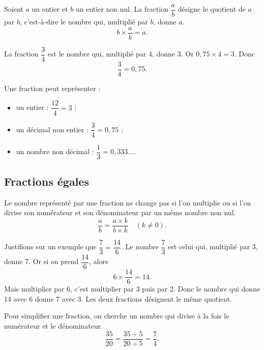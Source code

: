 \documentclass[11pt,a4paper]{article}
\begin{document}
\begin{definitionbox}
Soient \(a\) un entier et \(b\) un entier non nul. La fraction \(\dfrac{a}{b}\) désigne le quotient de \(a\) par \(b\), c'est-à-dire le nombre qui, multiplié par \(b\), donne \(a\).
\[
b\times\frac{a}{b}=a.
\]
\end{definitionbox}

\begin{exemplebox}
La fraction \(\dfrac{3}{4}\) est le nombre qui, multiplié par 4, donne 3. Or \(0,75\times4=3\). Donc
\[
\frac{3}{4}=0,75.
\]
\end{exemplebox}

\begin{retenirbox}
Une fraction peut représenter :
\begin{itemize}
\item un entier : \(\dfrac{12}{4}=3\) ;
\item un décimal non entier : \(\dfrac{3}{4}=0,75\) ;
\item un nombre non décimal : \(\dfrac{1}{3}=0,333\ldots\).
\end{itemize}
\end{retenirbox}

\subsection{Fractions égales}

\begin{theobox}
Le nombre représenté par une fraction ne change pas si l'on multiplie ou si l'on divise son numérateur et son dénominateur par un même nombre non nul.
\[
\frac{a}{b}=\frac{a\times k}{b\times k}\quad(k\neq0).
\]
\end{theobox}

\begin{preuvebox}
Justifions sur un exemple que \(\dfrac{7}{3}=\dfrac{14}{6}\). Le nombre \(\dfrac{7}{3}\) est celui qui, multiplié par 3, donne 7. Or si on prend \(\dfrac{14}{6}\), alors
\[
6\times\frac{14}{6}=14.
\]
Mais multiplier par 6, c'est multiplier par 3 puis par 2. Donc le nombre qui donne 14 avec 6 donne 7 avec 3. Les deux fractions désignent le même quotient.
\end{preuvebox}

\begin{methodbox}
Pour simplifier une fraction, on cherche un nombre qui divise à la fois le numérateur et le dénominateur.
\[
\frac{35}{20}=\frac{35\div5}{20\div5}=\frac{7}{4}.
\]
\end{methodbox}
\end{document}
